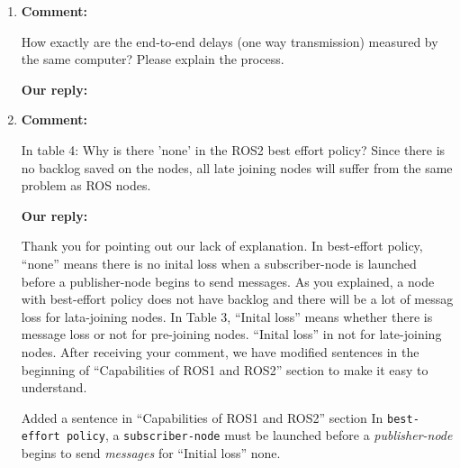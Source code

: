 \documentclass{article}
\begin{document}
\begin{enumerate}
  \begin{flushleft}
    \textbf{Our reply:}
  \end{flushleft}
  Thank you very much for pointing out a vital issue.
  This is important for fault tolerance and significant benefit of using ROS2.
  To highlight this point, we have added several sentences.
  \begin{itembox}[|]{Added sentences in ``2.1 Robot Operating System (ROS)'' section}
    In addition, due to use of DDS, ROS2 does not need a master process.
    \textcolor{red}{This is a import point in terms of fault tolerance.}
  \end{itembox}\\
  \begin{itembox}[|]{Added sentences in ``Lesson Learned'' section}
    We consider ROS2 outweigh its cost for using DDS.
    Fault tolerance of ROS2 is superior because it is able to save past data with \emph{QoS Policy} and does not have a master \emph{node}.
  \end{itembox}\\
  
\item \begin{flushleft}
    \textbf{Comment:}
  \end{flushleft}
  How exactly are the end-to-end delays (one way transmission) measured by the same computer? Please explain the process.

  \begin{flushleft}
    \textbf{Our reply:}
  \end{flushleft}
  
\item \begin{flushleft}
    \textbf{Comment:}
  \end{flushleft}
  In table 4: Why is there 'none' in the ROS2 best effort policy? Since there is no backlog saved on the nodes, all late joining nodes will suffer from the same problem as ROS nodes.

  \begin{flushleft}
    \textbf{Our reply:}
  \end{flushleft}
  Thank you for pointing out our lack of explanation.
  In best-effort policy, ``none'' means there is no inital loss when a subscriber-node is launched before a publisher-node begins to send messages.
  As you explained, a node with best-effort policy does not have backlog and there will be a lot of messag loss for lata-joining nodes.
  In Table 3, ``Inital loss'' means whether there is message loss or not for pre-joining nodes.
  ``Inital loss'' in not for late-joining nodes.
  After receiving your comment, we have modified sentences in the beginning of ``Capabilities of ROS1 and ROS2'' section to make it easy to understand.
  \begin{itembox}[|]{Added a sentence in ``Capabilities of ROS1 and ROS2'' section}
    In \texttt{best-effort policy}, a \texttt{subscriber-node} must be launched before a \emph{publisher-node} begins to send \emph{messages} for ``Initial loss'' none.
  \end{itembox}\\


\end{enumerate}
\end{document}
